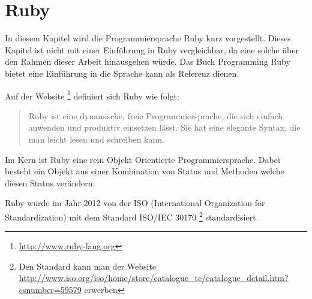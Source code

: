 \section{Ruby}
\label{section: Ruby}

In diesem Kapitel wird die Programmiersprache Ruby kurz vorgestellt. Dieses Kapitel ist nicht mit einer Einführung in Ruby vergleichbar, da eine solche über den Rahmen dieser Arbeit hinausgehen würde. Das Buch Programming Ruby \cite[]{Dav05} bietet eine Einführung in die Sprache kann als Referenz dienen. 

Auf der Website \footnote{\url{http://www.ruby-lang.org}} definiert sich Ruby wie folgt:

\begin{quote}
	Ruby ist eine dynamische, freie Programmiersprache, die sich einfach anwenden und produktiv einsetzen lässt. Sie hat eine elegante Syntax, die man leicht lesen und schreiben kann. \cite[]{Rub92}
\end{quote}



Im Kern ist Ruby eine rein Objekt Orientierte Programmiersprache. Dabei besteht ein Objekt aus einer Kombination von Status und Methoden welche diesen Status verändern. \cite[p. 1-2]{Dav05}

Ruby wurde im Jahr 2012 von der ISO (International Organization for Standardization) mit dem Standard ISO/IEC 30170 \footnote{Den Standard kann man der Website \url{http://www.iso.org/iso/home/store/catalogue_tc/catalogue_detail.htm?csnumber=59579} erwerben} standardisiert.